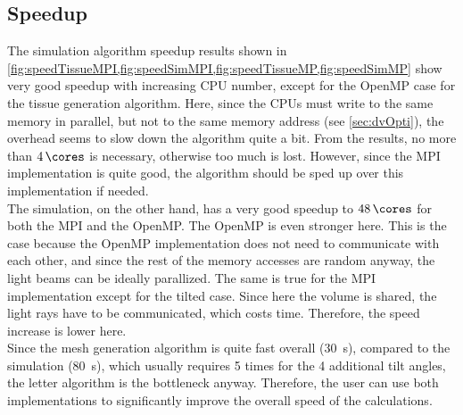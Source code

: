 \subsection{Speedup}
%
The simulation algorithm speedup results shown in \cref{fig:speedTissueMPI,fig:speedSimMPI,fig:speedTissueMP,fig:speedSimMP} show very good speedup with increasing \ac{CPU} number, except for the \ac{OpenMP} case for the tissue generation algorithm.
Here, since the \acsp{CPU} must write to the same memory in parallel, but not to the same memory address (see \cref{sec:dvOpti}), the overhead seems to slow down the algorithm quite a bit.
From the results, no more than $\SI{4}{\cores}$ is necessary, otherwise too much \dummy{} is lost.
However, since the \ac{MPI} implementation is quite good, the algorithm should be sped up over this implementation if needed.
\\
%
The simulation, on the other hand, has a very good speedup to $\SI{48}{\cores}$ for both the \ac{MPI} and the \ac{OpenMP}.
The \ac{OpenMP} is even stronger here.
This is the case because the \ac{OpenMP} implementation does not need to communicate with each other, and since the rest of the memory accesses are random anyway, the light beams can be ideally parallized.
The same is true for the \ac{MPI} implementation except for the tilted case.
Since here the volume is shared, the light rays have to be communicated, which costs time.
Therefore, the speed increase is lower here.
\\
%
Since the mesh generation algorithm is quite fast overall (\SI{30}{\second}), compared to the simulation (\SI{80}{\second}), which usually requires 5 times for the 4 additional tilt angles, the letter algorithm is the bottleneck anyway.
Therefore, the user can use both implementations to significantly improve the overall speed of the calculations.
%
%
%
